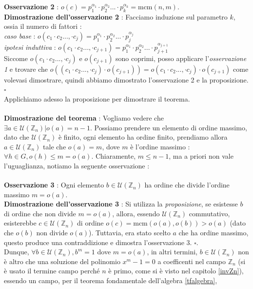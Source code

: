 \documentclass[12pt, letterpaper]{article}
\newcommand{\Z}{{\mathbb Z}}
\newcommand{\mcm}{{\text{mcm}}}
\begin{document}
\textbf{Osservazione 2} : \(o(c)=p_1^{\alpha_1}\cdot p_2^{\alpha_2}...\cdot p_k^{\alpha_k}=\mcm(n,m)\).\\
\textbf{Dimostrazione dell'osservazione 2} : Facciamo induzione sul parametro \(k\), ossia il numero di fattori :
\\ \textit{caso base} : \(o(c_1\cdot c_2...,\cdot c_j)=p_1^{\alpha_1}\cdot p_2^{\alpha_2}...\cdot p_j^{\alpha_j}\)\\
\textit{ipotesi induttiva} : \(o(c_1\cdot c_2...,\cdot c_{j+1})=p_1^{\alpha_1}\cdot p_2^{\alpha_2}...\cdot p_{j+1}^{\alpha_{j+1}}\)\\
Siccome \(o(c_1\cdot c_2...,\cdot c_j)\) e \(o(c_{j+1})\) sono coprimi, posso applicare l'\textit{osservazione 1} e trovare 
che \(o((c_1\cdot c_2...,\cdot c_j)\cdot o(c_{j+1}))=o(c_1\cdot c_2...,\cdot c_j)\cdot o(c_{j+1})\) come volevasi dimostrare, quindi abbiamo 
dimostrato l'osservazione 2 e la proposizione. \(\square\)\\
Applichiamo adesso la proposizione per dimostrare il teorema.\\\hphantom{}\\
\textbf{Dimostrazione del teorema} : Vogliamo vedere che \(\exists a\in \mathcal{U}(\Z_n)|o(a)=n-1\). Possiamo prendere 
un elemento di ordine massimo, dato che \(\mathcal{U}(\Z_n)\) è finito, ogni elemento ha ordine finito, prendiamo 
allora \(a\in \mathcal{U}(\Z_n)\) tale che \(o(a)=m\), dove \(m\) è l'ordine massimo : \(\forall h\in G,o(h)\le m=o(a)\). Chiaramente, 
\(m\le n-1\), ma a priori non vale l'uguaglianza, notiamo la seguente osservazione :\\\hphantom{}\\
\textbf{Osservazione 3} : Ogni elemento \(b\in \mathcal{U}(\Z_n)\) ha ordine che divide l'ordine massimo \(m=o(a)\).\\
\textbf{Dimostrazione dell'osservazione 3} : Si utilizza la \textit{proposizione}, se esistesse \(b\) di ordine 
che non divide \(m=o(a)\), allora, essendo \(\mathcal{U}(\Z_n)\) commutativo, esisterebbe \(c\in\mathcal{U}(\Z_n)\) di 
ordine \(o(c)=\mcm(o(a),o(b))>o(a)\) (dato che \(o(b)\) non divide \(o(a)\)). Tuttavia, era stato scelto \(a\) che ha ordine 
massimo, questo produce una contraddizione e dimostra l'osservazione 3. \(\square\).\\
Dunque, \(\forall b\in \mathcal{U}(\Z_n), b^m=1\) dove \(m=o(a)\), in altri termini, \(b\in \mathcal{U}(\Z_n)\) non 
è altro che una soluzione del polinomio \(x^m-1=0\) a coefficenti nel campo \(\Z_n\) (si è usato il termine campo perché 
\(n\) è primo, come si è visto nel capitolo \ref{invZn}), essendo un campo, per il teorema fondamentale dell'algebra \ref{tfalgebra}, 
\end{document}
